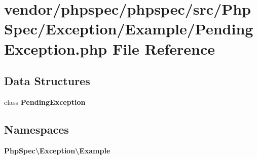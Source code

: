 \section{vendor/phpspec/phpspec/src/\+Php\+Spec/\+Exception/\+Example/\+Pending\+Exception.php File Reference}
\label{_pending_exception_8php}
\subsection*{Data Structures}
\begin{DoxyCompactItemize}
\item 
class {\bf Pending\+Exception}
\end{DoxyCompactItemize}
\subsection*{Namespaces}
\begin{DoxyCompactItemize}
\item 
 {\bf Php\+Spec\textbackslash{}\+Exception\textbackslash{}\+Example}
\end{DoxyCompactItemize}
